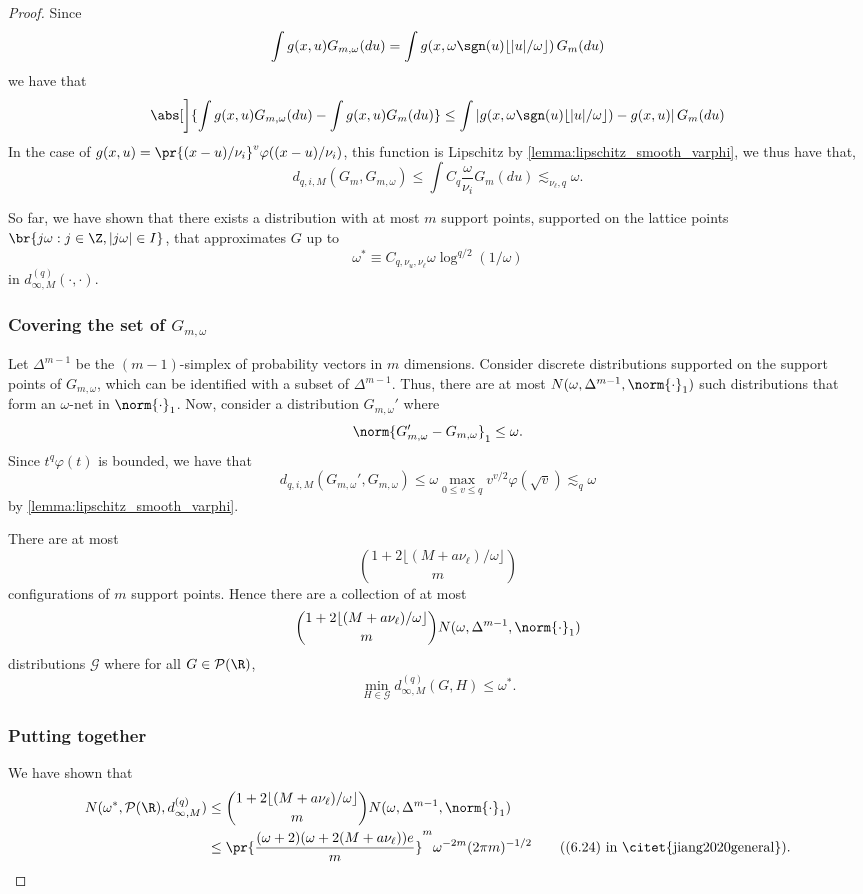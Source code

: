 \documentclass[12pt, reqno]{amsart}
\numberwithin{equation}{section}
\begin{document}
\begin{refsection}
\begin{appendices}
\begin{proof}
Since \[
\int g(x, u) G_{m,\omega}(du) = \int g(x, \omega \sgn
(u)\lfloor |u|/\omega\rfloor) \, G_m(du)
\]
we have that \[
\abs[\bigg]{\int g(x, u) G_{m,\omega}(du) - \int g(x,u) G_m(du)} \le \int |g
(x, \omega \sgn
(u)\lfloor |u|/\omega\rfloor) - g(x, u)| \, G_m(du)
\]
In the case of $g(x, u) = \pr{(x-u)/\nu_i}^v \varphi((x-u)/\nu_i)$, this function is
Lipschitz by \cref{lemma:lipschitz_smooth_varphi}, we thus
have that, \[
d_{q,i,M}(G_m, G_{m,\omega}) \le \int C_q \frac{\omega}{\nu_i} G_m
(du)\lesssim_{\nu_\ell, q} \omega.
\]


So far, we have shown that there exists a distribution with at most $m$
support points, supported on the lattice points $\br{j\omega : j\in \Z,
|j\omega| \in I}$, that approximates $G$ up to \[
\omega^*\equiv C_{q, \nu_u, \nu_\ell}  \omega \log^{q/2} (1/\omega)
\]
in $d_{\infty, M}^{(q)}(\cdot, \cdot)$.

\subsubsection{Covering the set of $G_{m,\omega}$}
Let $\Delta^{m-1}$ be the $(m-1)$-simplex of probability vectors in $m$ dimensions.
Consider discrete distributions supported on the support points of $G_{m,\omega}$, which
can be identified with a subset of $\Delta^{m-1}$. Thus, there are at most $N(\omega,
\Delta^{m-1}, \norm{\cdot}_1)$ such distributions that form an $\omega$-net in
$\norm{\cdot}_1$. Now, consider a distribution $G_{m,\omega}'$ where \[
\norm{G_{m,\omega}' - G_{m,\omega}}_1 \le \omega.
\]
Since $t^q \varphi(t)$ is bounded, we have that \[
d_{q,i,M}(G_{m,\omega}' , G_{m,\omega}) \le \omega \max_{0 \le v\le q} v^
{v/2}\varphi (
\sqrt{v})
\lesssim_q \omega
\]
by \cref{lemma:lipschitz_smooth_varphi}.

There are at most \[
\binom{1 + 2 \lfloor (M + a \nu_\ell) / \omega \rfloor}{m}
\]
configurations of $m$ support points. Hence there are a collection of at
most  \[
\binom{1 + 2 \lfloor (M + a \nu_\ell) / \omega \rfloor}{m} N(\omega, \Delta^{m-1},
\norm{\cdot}_1)
\] distributions $\mathcal G$ where for all $G \in \mathcal P(\R)$, \[
\min_{H\in \mathcal G} d_{\infty, M}^{(q)}(G, H) \le \omega^*.
\]

\subsubsection{Putting together} 
We have shown that 
\begin{align*}
N(\omega^*, \mathcal P(\R), d^{(q)}_{\infty, M}) &\le \binom{1 + 2 \lfloor (M + a
\nu_\ell) / \omega \rfloor}{m} N(\omega, \Delta^{m-1},
\norm{\cdot}_1)
\\
 &\le
\pr{\frac{(\omega + 2) (\omega + 2(M + a \nu_\ell)) e}{m}}^m \omega^{-2m} (2\pi m)^
{-1/2} \tag{(6.24) in \citet{jiang2020general}}.
\end{align*}


\end{proof}
\end{appendices}
\end{refsection}
\end{document}

